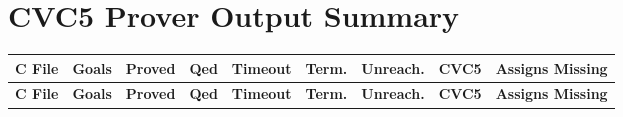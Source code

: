 \documentclass{article}
\begin{document}
\section*{CVC5 Prover Output Summary}

\scriptsize
\begin{longtable}{p{3.5cm} >{\centering\arraybackslash}p{0.8cm} >{\centering\arraybackslash}p{1.3cm} >{\centering\arraybackslash}p{0.7cm} >{\centering\arraybackslash}p{0.9cm} >{\centering\arraybackslash}p{0.9cm} >{\centering\arraybackslash}p{0.9cm} >{\centering\arraybackslash}p{1cm} >{\centering\arraybackslash}p{1.8cm}}
\toprule
\textbf{C File} & \textbf{Goals} & \textbf{Proved} & \textbf{Qed} & \textbf{Timeout} & \textbf{Term.} & \textbf{Unreach.} & \textbf{CVC5} & \textbf{Assigns Missing} \\
\midrule
\endfirsthead

\toprule
\textbf{C File} & \textbf{Goals} & \textbf{Proved} & \textbf{Qed} & \textbf{Timeout} & \textbf{Term.} & \textbf{Unreach.} & \textbf{CVC5} & \textbf{Assigns Missing} \\
\midrule
\endhead


\end{longtable}
\end{document}
